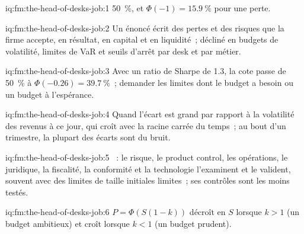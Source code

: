 \begin{solution}{iq:fm:the-head-of-desks-job:1}
50~\%, et $\Phi(-1)=15.9~\%$ pour une perte.
\end{solution}

\begin{solution}{iq:fm:the-head-of-desks-job:2}
Un énoncé écrit des pertes et des risques que la firme accepte, en résultat, en capital et en liquidité~; décliné en budgets de volatilité, limites de VaR et
seuils d'arrêt par desk et par métier.
\end{solution}

\begin{solution}{iq:fm:the-head-of-desks-job:3}
Avec un ratio de Sharpe de 1.3, la cote passe de 50~\% à $\Phi(-0.26)=39.7~\%$~; demander les limites dont le budget a besoin ou un budget à l'espérance.
\end{solution}

\begin{solution}{iq:fm:the-head-of-desks-job:4}
Quand l'écart est grand par rapport à la volatilité des revenus à ce jour, qui croît avec la racine carrée du temps~; au bout d'un trimestre, la plupart des écarts sont du bruit.
\end{solution}

\begin{solution}{iq:fm:the-head-of-desks-job:5}
~: le risque, le product control, les opérations, le juridique, la fiscalité, la conformité et la technologie l'examinent et le valident, souvent avec des limites de taille initiales
limites~; ses contrôles sont les moins testés.
\end{solution}

\begin{solution}{iq:fm:the-head-of-desks-job:6}
$P=\Phi(S(1-k))$ décroît en $S$ lorsque $k>1$ (un budget ambitieux) et croît lorsque $k<1$ (un budget prudent).
\end{solution}
